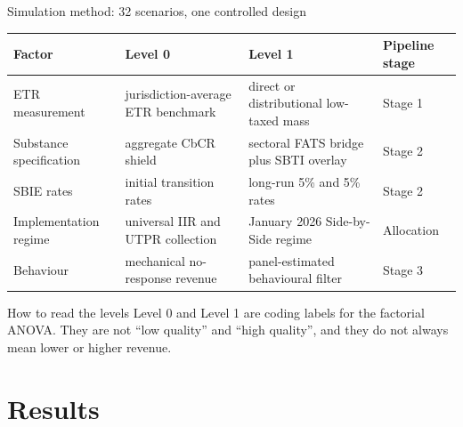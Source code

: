 \documentclass[aspectratio=169, 11pt]{beamer}
\begin{document}
\begin{frame}{Simulation method: 32 scenarios, one controlled design}
\begin{center}
\scriptsize
\begin{tabular}{@{}L{2.5cm}L{3.7cm}L{3.7cm}L{2.4cm}@{}}
  \toprule
  \textbf{Factor} & \textbf{Level 0} & \textbf{Level 1} & \textbf{Pipeline stage} \\
  \midrule
  ETR measurement & jurisdiction-average ETR benchmark & direct or distributional low-taxed mass & Stage 1 \\
  Substance specification & aggregate CbCR shield & sectoral FATS bridge plus SBTI overlay & Stage 2 \\
  SBIE rates & initial transition rates & long-run 5\% and 5\% rates & Stage 2 \\
  Implementation regime & universal IIR and UTPR collection & January 2026 Side-by-Side regime & Allocation \\
  Behaviour & mechanical no-response revenue & panel-estimated behavioural filter & Stage 3 \\
  \bottomrule
\end{tabular}
\end{center}

\vspace{0.55em}
\begin{block}{How to read the levels}
  Level 0 and Level 1 are coding labels for the factorial ANOVA. They are not ``low quality'' and ``high quality'', and they do not always mean lower or higher revenue.
\end{block}
\end{frame}

\section{Results}
\end{document}
